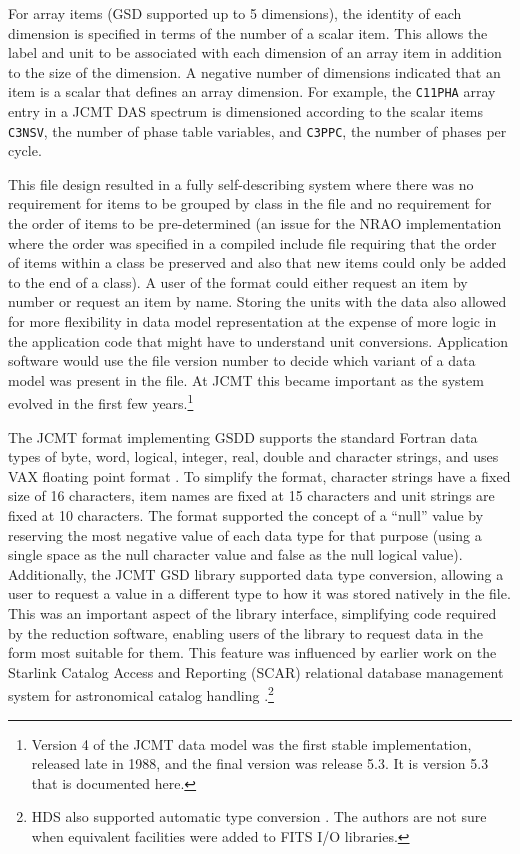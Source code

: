 \documentclass[final,authoryear,5p,times,twocolumn]{elsarticle}
\begin{document}
For array items (GSD supported up to 5 dimensions), the
identity of each dimension is specified in terms of the number of a
scalar item. This allows the label and unit to be associated with each
dimension of an array item in addition to the size of the dimension. A
negative number of dimensions indicated that an item is a scalar that
defines an array dimension. For example, the \texttt{C11PHA} array
entry in a JCMT DAS spectrum \citep{1986SPIE..598..134B} is
dimensioned according to the scalar items \texttt{C3NSV}, the number
of phase table variables, and \texttt{C3PPC}, the number of phases per
cycle.

This file design resulted in a fully self-describing system
where there was no requirement for items to be grouped by class in the
file and no requirement for the order of items to be pre-determined
(an issue for the NRAO implementation where the order was specified in
a compiled include file requiring that the order of items within a
class be preserved and also that new items could only be added to the
end of a class). A user of the format could either
request an item by number or request an item by name. Storing the
units with the data also allowed for more flexibility in data model
representation at the expense of more logic in the application code
that might have to understand unit conversions. Application software
would use the file version number to decide which variant of a data
model was present in the file. At JCMT this became important as the
system evolved in the first few years.\footnote{Version 4 of the JCMT
  data model was the first stable implementation, released late in
  1988, and the final version was release 5.3. It is version 5.3 that
  is documented here.}

The JCMT format implementing GSDD supports the standard Fortran data
types of byte, word, logical, integer, real, double and character
strings, and uses VAX floating point format \citep[see][for more
information on VAX floating point
format]{Payne:1980:VFP:641845.641849}. To simplify the format,
character strings have a fixed size of 16 characters, item names are
fixed at 15 characters and unit strings are fixed at 10
characters. The format supported the concept of a ``null'' value by
reserving the most negative value of each data type for that purpose
(using a single space as the null character value and false as the
null logical value). Additionally, the JCMT GSD library supported data
type conversion, allowing a user to request a value in a different
type to how it was stored natively in the file. This was an important
aspect of the library interface, simplifying code required by the
reduction software, enabling users of the library to request data in
the form most suitable for them. This feature was influenced by
earlier work on the Starlink Catalog Access and Reporting (SCAR)
relational database management system for astronomical catalog
handling \citep{SUN70}.\footnote{HDS also supported automatic type
  conversion \citep{SSN27}. The authors are not sure when equivalent
  facilities were added to FITS I/O libraries.}
\end{document}

